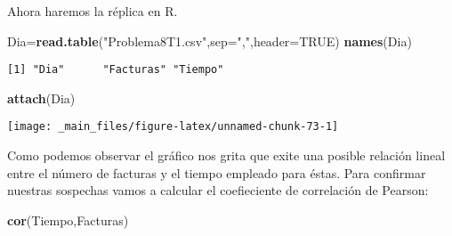 \documentclass[
  a4paper,
  oneside,
  openany]{book}
\newenvironment{Shaded}{\begin{snugshade}}{\end{snugshade}}
\newcommand{\AttributeTok}[1]{\textcolor[rgb]{0.13,0.29,0.53}{#1}}
\newcommand{\ConstantTok}[1]{\textcolor[rgb]{0.56,0.35,0.01}{#1}}
\newcommand{\DecValTok}[1]{\textcolor[rgb]{0.00,0.00,0.81}{#1}}
\newcommand{\FunctionTok}[1]{\textcolor[rgb]{0.13,0.29,0.53}{\textbf{#1}}}
\newcommand{\NormalTok}[1]{#1}
\newcommand{\OtherTok}[1]{\textcolor[rgb]{0.56,0.35,0.01}{#1}}
\newcommand{\SpecialCharTok}[1]{\textcolor[rgb]{0.81,0.36,0.00}{\textbf{#1}}}
\newcommand{\StringTok}[1]{\textcolor[rgb]{0.31,0.60,0.02}{#1}}
\begin{document}
Ahora haremos la réplica en R.

\begin{Shaded}
\begin{Highlighting}[]
\NormalTok{Dia}\OtherTok{=}\FunctionTok{read.table}\NormalTok{(}\StringTok{"Problema8T1.csv"}\NormalTok{,}\AttributeTok{sep=}\StringTok{","}\NormalTok{,}\AttributeTok{header=}\ConstantTok{TRUE}\NormalTok{)}
\FunctionTok{names}\NormalTok{(Dia)}
\end{Highlighting}
\end{Shaded}

\begin{verbatim}
[1] "Dia"      "Facturas" "Tiempo"  
\end{verbatim}

\begin{Shaded}
\begin{Highlighting}[]
\FunctionTok{attach}\NormalTok{(Dia)}
\end{Highlighting}
\end{Shaded}

\begin{Shaded}
\end{Shaded}

\begin{center}\texttt{[image: \_main\_files/figure-latex/unnamed-chunk-73-1]} \end{center}

Como podemos observar el gráfico nos grita que exite una posible relación lineal entre el número de facturas y el tiempo empleado para éstas.
Para confirmar nuestras sospechas vamos a calcular el coefieciente de correlación de Pearson:

\begin{Shaded}
\begin{Highlighting}[]
\FunctionTok{cor}\NormalTok{(Tiempo,Facturas)}
\end{Highlighting}
\end{Shaded}
\end{document}
